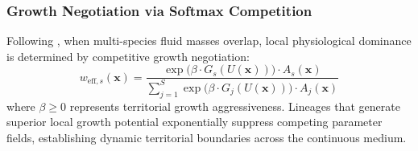 \subsubsection{Growth Negotiation via Softmax Competition}
Following \textcite{plantec2025flowlenia}, when multi-species fluid masses overlap, local physiological dominance is determined by competitive growth negotiation:
\begin{equation}
w_{\text{eff}, s}(\mathbf{x}) = \frac{\exp\Big(\beta \cdot G_s(U(\mathbf{x}))\Big) \cdot A_s(\mathbf{x})}{\sum_{j=1}^{S} \exp\Big(\beta \cdot G_j(U(\mathbf{x}))\Big) \cdot A_j(\mathbf{x})}
\label{eq:softmax_negotiation}
\end{equation}
where $\beta \ge 0$ represents territorial growth aggressiveness. Lineages that generate superior local growth potential exponentially suppress competing parameter fields, establishing dynamic territorial boundaries across the continuous medium.